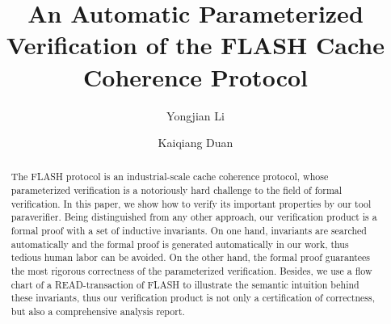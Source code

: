 \documentclass{llncs-new}
\newcommand{\bedt}[1]{{\color{black}#1}}
\begin{document}
\title{  An Automatic Parameterized Verification of the FLASH Cache Coherence Protocol}
\author{Yongjian Li   \and
        Kaiqiang Duan   %
      }

\maketitle
\vspace{-5pt}
\begin{abstract}
The FLASH protocol is an industrial-scale cache coherence protocol, whose parameterized verification is a notoriously hard challenge to the field of formal \bedt{verification}. In this paper, we show how to verify its important properties by our tool {\sf paraverifier}. Being distinguished from any other approach, our verification product is a formal  proof with a set of inductive invariants. %
\bedt{On one hand, invariants are searched automatically and the formal proof is generated automatically in our work, thus tedious human labor can be avoided. On the other hand, the formal proof guarantees the most rigorous correctness of the parameterized verification. Besides, we use a flow chart of a READ-transaction of FLASH to illustrate the semantic intuition behind these invariants, thus our verification product is not only a certification of correctness, but also a comprehensive analysis report.}

\end{abstract}
\vspace{-20pt}
\end{document}
